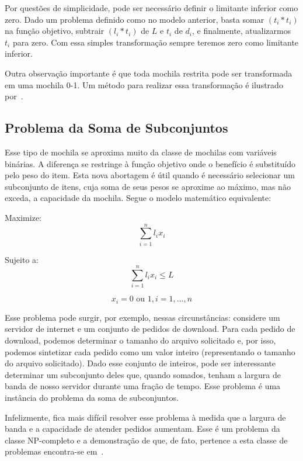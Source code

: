 Por questões de simplicidade, pode ser necessário definir o limitante inferior como zero. Dado um problema definido como no modelo anterior, basta somar $(t_i*t_i)$ na função objetivo, subtrair $(l_i * t_i)$ de $L$ e $t_i$ de $d_i$, e finalmente, atualizarmos $t_i$ para zero. Com essa simples transformação sempre teremos zero como limitante inferior. 

Outra observação importante é que toda mochila restrita pode ser transformada em uma mochila 0-1. Um método para realizar essa transformação é ilustrado por~\cite{MT90}.

\subsection{Problema da Soma de Subconjuntos}

Esse tipo de mochila se aproxima muito da classe de mochilas com variáveis binárias. A diferença se restringe à função objetivo onde o benefício é substituído pelo peso do item. Esta nova abortagem é útil quando é necessário selecionar um subconjunto de itens, cuja soma de seus pesos se aproxime ao máximo, mas não exceda, a capacidade da mochila.  Segue o modelo matemático equivalente:

\hspace*{3.0cm} Maximize:
\begin{equation}
 \sum_{i=1}^n l_i x_i 
\end{equation} 

\hspace*{3.0cm} Sujeito a:
\begin{equation}
 \sum_{i=1}^n l_i x_i  \leq L
\end{equation} 

\begin{equation}
 x_i=0 \textrm{ ou } 1, i=1,...,n 
\end{equation} 

Esse problema pode surgir, por exemplo, nessas circunstâncias: considere um servidor de internet e um conjunto de pedidos de download. Para cada pedido de download, podemos determinar o tamanho do arquivo solicitado e, por isso, podemos sintetizar cada pedido como um valor inteiro (representando o tamanho do arquivo solicitado). Dado esse conjunto de inteiros, pode ser interessante determinar um subconjunto deles que, quando somados, tenham a largura de banda de nosso servidor durante uma fração de tempo. Esse problema é uma instância do problema da soma de subconjuntos. 

Infelizmente, fica mais difícil resolver esse problema à medida que a largura de banda e a capacidade de atender pedidos aumentam. Esse é um problema da classe NP-completo e a demonstração de que, de fato, pertence a esta classe de problemas encontra-se em~\cite{MTG02}.

